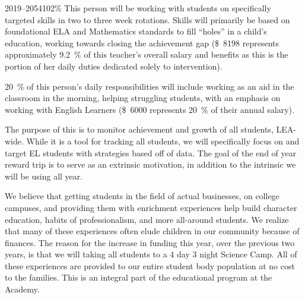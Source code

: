 \documentclass{article}
\newcommand{\dollar}[1]{\SI{#1}[\$]{}}
\newcounter{goal}[section] %
\begin{document}
\begin{demIISUP}{2019--20}{54102}{\si{\percent}}
 This person will be working with students on specifically targeted skills in two to three week rotations. Skills will primarily be based on foundational ELA and Mathematics standards to fill ``holes'' in a child's education, working towards closing the achievement gap (\dollar{8198} represents approximately \SI{9.2}{\percent} of this teacher's overall salary and benefits as this is the portion of her daily duties dedicated solely to intervention).

 \SI{20}{\percent} of this person's daily responsibilities will include working as an aid in the classroom in the morning, helping struggling students, with an emphasis on working with English Learners (\dollar{6000} represents \SI{20}{\percent} of their annual salary).

 The purpose of this is to monitor achievement and growth of all students, LEA-wide. While it is a tool for tracking all students, we will specifically focus on and target EL students with strategies based off of data. The goal of the end of year reward trip is to serve as an extrinsic motivation, in addition to the intrinsic we will be using all year.

 We believe that getting students in the field of actual businesses, on college campuses, and providing them with enrichment experiences help build character education, habits of professionalism, and more all-around students. We realize that many of these experiences often elude children in our community because of finances. The reason for the increase in funding this year, over the previous two years, is that we will taking all students to a 4 day 3 night Science Camp. All of these experiences are provided to our entire student body population at no cost to the families. This is an integral part of the educational program at the Academy.
\end{demIISUP}
\end{document}
